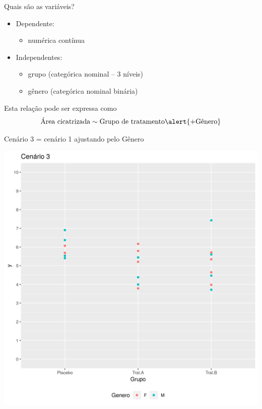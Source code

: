 \documentclass{beamer}
\begin{document}
\begin{frame}{Quais são as variáveis?}
  \begin{itemize}
    \small
  \item Dependente:
    \begin{itemize}
      \footnotesize
    \item numérica contínua
    \end{itemize}
  \item Independentes:
    \begin{itemize}
      \footnotesize
    \item grupo (categórica nominal -- 3 níveis)
    \item \alert{gênero (categórica nominal binária)}
    \end{itemize}
  \end{itemize}
  \vfill
  \begin{block}{Esta relação pode ser expressa como}
    \begin{displaymath}
      \text{Área cicatrizada} \sim \text{Grupo de tratamento} \alert{+ \text{Gênero}}
    \end{displaymath}
  \end{block}
\end{frame}



\begin{frame}[label=cenario3]{\small Cenário 3 = cenário 1 ajustando pelo Gênero}
  \begin{center}
    \includegraphics[height=.9\textheight]{Cap13-30/cenario12}
  \end{center}
\end{frame}
\end{document}
